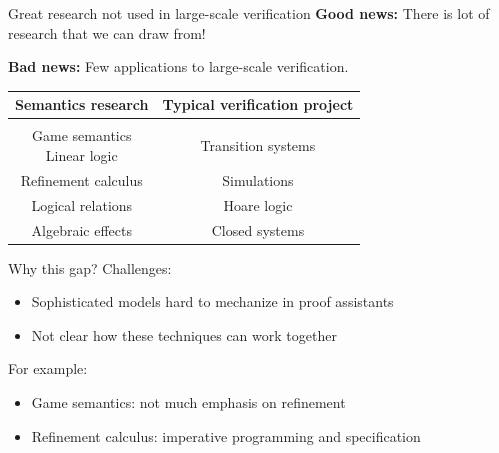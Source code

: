 \documentclass[aspectratio=141]{beamer}
\begin{document}
\begin{frame}{Great research not used in large-scale verification} %
  \textbf{Good news:}
  There is lot of research that we can draw from!

  \textbf{Bad news:}
  Few applications to
  large-scale verification.

  \vfill
  \begin{center}
    \begin{tabular}{cc}
      \hline
      Semantics research &
      Typical verification project
      \\
      \hline
      \\[-1ex]
      \parbox{10em}{\centering Game semantics \\ Linear logic} &
      Transition systems \\[1em]
      Refinement calculus &
      Simulations \\[1em]
      Logical relations &
      Hoare logic \\[1em]
      Algebraic effects &
      Closed systems \\[1em]
      \hline
    \end{tabular}
  \end{center}
\end{frame}

\begin{frame}{Why this gap?} %
  Challenges:
  \begin{itemize}
    \item Sophisticated models hard to mechanize in proof assistants
    \item Not clear how these techniques can work together
  \end{itemize}

  For example:
  \begin{itemize}
    \item Game semantics: not much emphasis on refinement
    \item Refinement calculus: imperative programming and specification
  \end{itemize}
\end{frame}  
\end{document}
